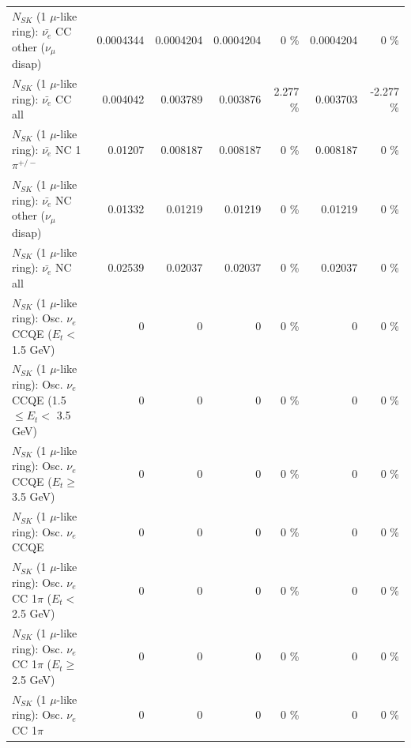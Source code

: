 \begin{table}
\begin{tabular}{| l | r | r | r  r | r  r |}
          $N_{SK}$ (1 $\mu$-like ring): $\bar{\nu_e}$ CC other ($\nu_\mu$ disap) &       0.0004344 &       0.0004204 &       0.0004204 &        0 \%  &       0.0004204 &        0 \%  \\ 
                            $N_{SK}$ (1 $\mu$-like ring): $\bar{\nu_{e}}$ CC all &        0.004042 &        0.003789 &        0.003876 &    2.277 \%  &        0.003703 &   -2.277 \%  \\ 
\hline
                     $N_{SK}$ (1 $\mu$-like ring): $\bar{\nu_e}$ NC 1$\pi^{+/-}$ &         0.01207 &        0.008187 &        0.008187 &        0 \%  &        0.008187 &        0 \%  \\ 
          $N_{SK}$ (1 $\mu$-like ring): $\bar{\nu_e}$ NC other ($\nu_\mu$ disap) &         0.01332 &         0.01219 &         0.01219 &        0 \%  &         0.01219 &        0 \%  \\ 
                            $N_{SK}$ (1 $\mu$-like ring): $\bar{\nu_{e}}$ NC all &         0.02539 &         0.02037 &         0.02037 &        0 \%  &         0.02037 &        0 \%  \\ 
\hline
\hline
\hline
             $N_{SK}$ (1 $\mu$-like ring): Osc. $\nu_e$ CCQE ($E_{t} <$ 1.5 GeV) &               0 &               0 &               0 &        0 \%  &               0 &        0 \%  \\ 
    $N_{SK}$ (1 $\mu$-like ring): Osc. $\nu_e$ CCQE (1.5 $\leq E_{t} <$ 3.5 GeV) &               0 &               0 &               0 &        0 \%  &               0 &        0 \%  \\ 
          $N_{SK}$ (1 $\mu$-like ring): Osc. $\nu_e$ CCQE ($E_{t} \geq$ 3.5 GeV) &               0 &               0 &               0 &        0 \%  &               0 &        0 \%  \\ 
\hline
                                 $N_{SK}$ (1 $\mu$-like ring): Osc. $\nu_e$ CCQE &               0 &               0 &               0 &        0 \%  &               0 &        0 \%  \\ 
\hline
        $N_{SK}$ (1 $\mu$-like ring): Osc. $\nu_e$ CC 1$\pi$ ($E_{t} <$ 2.5 GeV) &               0 &               0 &               0 &        0 \%  &               0 &        0 \%  \\ 
     $N_{SK}$ (1 $\mu$-like ring): Osc. $\nu_e$ CC 1$\pi$ ($E_{t} \geq$ 2.5 GeV) &               0 &               0 &               0 &        0 \%  &               0 &        0 \%  \\ 
\hline
                            $N_{SK}$ (1 $\mu$-like ring): Osc. $\nu_e$ CC 1$\pi$ &               0 &               0 &               0 &        0 \%  &               0 &        0 \%  \\ 

\end{tabular}
\end{table}
